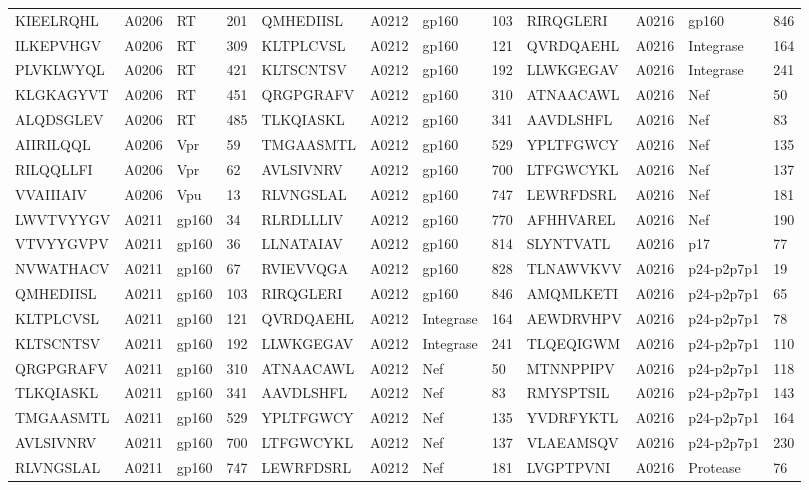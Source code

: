 \begin{table}[htp]
\begin{center}
\begin{sideways}
{\begin{tabulary}{1.5\textwidth}{|l|l|l|l|l|l|l|l|l|l|l|l|}
KIEELRQHL & A0206 & RT & 201 & QMHEDIISL & A0212 & gp160 & 103 & RIRQGLERI & A0216 & gp160 & 846 \\
ILKEPVHGV & A0206 & RT & 309 & KLTPLCVSL & A0212 & gp160 & 121 & QVRDQAEHL & A0216 & Integrase & 164 \\
PLVKLWYQL & A0206 & RT & 421 & KLTSCNTSV & A0212 & gp160 & 192 & LLWKGEGAV & A0216 & Integrase & 241 \\
KLGKAGYVT & A0206 & RT & 451 & QRGPGRAFV & A0212 & gp160 & 310 & ATNAACAWL & A0216 & Nef & 50 \\
ALQDSGLEV & A0206 & RT & 485 & TLKQIASKL & A0212 & gp160 & 341 & AAVDLSHFL & A0216 & Nef & 83 \\
AIIRILQQL & A0206 & Vpr & 59 & TMGAASMTL & A0212 & gp160 & 529 & YPLTFGWCY & A0216 & Nef & 135 \\
RILQQLLFI & A0206 & Vpr & 62 & AVLSIVNRV & A0212 & gp160 & 700 & LTFGWCYKL & A0216 & Nef & 137 \\
VVAIIIAIV & A0206 & Vpu & 13 & RLVNGSLAL & A0212 & gp160 & 747 & LEWRFDSRL & A0216 & Nef & 181 \\
LWVTVYYGV & A0211 & gp160 & 34 & RLRDLLLIV & A0212 & gp160 & 770 & AFHHVAREL & A0216 & Nef & 190 \\
VTVYYGVPV & A0211 & gp160 & 36 & LLNATAIAV & A0212 & gp160 & 814 & SLYNTVATL & A0216 & p17 & 77 \\
NVWATHACV & A0211 & gp160 & 67 & RVIEVVQGA & A0212 & gp160 & 828 & TLNAWVKVV & A0216 & p24-p2p7p1 & 19 \\
QMHEDIISL & A0211 & gp160 & 103 & RIRQGLERI & A0212 & gp160 & 846 & AMQMLKETI & A0216 & p24-p2p7p1 & 65 \\
KLTPLCVSL & A0211 & gp160 & 121 & QVRDQAEHL & A0212 & Integrase & 164 & AEWDRVHPV & A0216 & p24-p2p7p1 & 78 \\
KLTSCNTSV & A0211 & gp160 & 192 & LLWKGEGAV & A0212 & Integrase & 241 & TLQEQIGWM & A0216 & p24-p2p7p1 & 110 \\
QRGPGRAFV & A0211 & gp160 & 310 & ATNAACAWL & A0212 & Nef & 50 & MTNNPPIPV & A0216 & p24-p2p7p1 & 118 \\
TLKQIASKL & A0211 & gp160 & 341 & AAVDLSHFL & A0212 & Nef & 83 & RMYSPTSIL & A0216 & p24-p2p7p1 & 143 \\
TMGAASMTL & A0211 & gp160 & 529 & YPLTFGWCY & A0212 & Nef & 135 & YVDRFYKTL & A0216 & p24-p2p7p1 & 164 \\
AVLSIVNRV & A0211 & gp160 & 700 & LTFGWCYKL & A0212 & Nef & 137 & VLAEAMSQV & A0216 & p24-p2p7p1 & 230 \\
RLVNGSLAL & A0211 & gp160 & 747 & LEWRFDSRL & A0212 & Nef & 181 & LVGPTPVNI & A0216 & Protease & 76 \\

\end{tabulary}}
\end{sideways}
\end{center}
\end{table}
